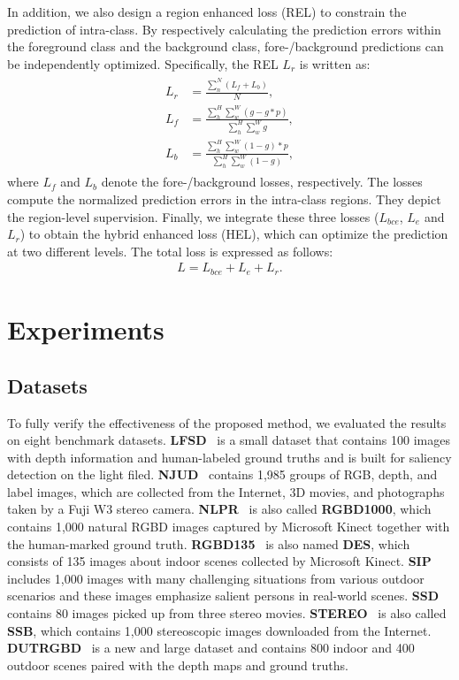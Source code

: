 \documentclass[runningheads]{llncs}
\begin{document}
In addition, we also design a region enhanced loss (REL)  to constrain the prediction of intra-class. By respectively calculating the prediction errors within the foreground class and the background class, fore-/background predictions can be independently optimized. Specifically, the REL $L_{r}$ is written as:
\begin{align}
 \begin{split}
  L_{r} & = \frac{\sum^{N}_{n} (L_{f} + L_{b})}{N}, \\
  L_{f} & = \frac{\sum^H_h\sum^W_w (g - g * p)}{\sum^H_h\sum^W_w g}, \\
  L_{b} & = \frac{\sum^H_h\sum^W_w (1 - g) * p}{\sum^H_h\sum^W_w (1 - g)},
 \end{split}
 \label{equ:regionloss}
\end{align}
\noindent where $L_{f}$ and $L_{b}$ denote the fore-/background losses, respectively. The losses compute the normalized prediction errors in the intra-class regions. They depict the region-level supervision.
Finally, we integrate these three losses ($L_{bce}$, $L_{e}$ and $L_{r}$) to obtain the hybrid enhanced loss (HEL), which can optimize the prediction at two different levels.  The total loss is expressed as follows:
\begin{equation}
 \begin{split}
  L = L_{bce} + L_{e} + L_{r}.
 \end{split}
 \label{equ:totalloss}
\end{equation}

\section{Experiments}

\subsection{Datasets}

To fully verify the effectiveness of the proposed method, we evaluated the results on eight benchmark datasets.
\textbf{LFSD}~\cite{LFSD} is a small dataset that contains 100 images with depth information and human-labeled ground truths and is built for saliency detection on the light filed.
\textbf{NJUD}~\cite{NLUD} contains 1,985 groups of RGB, depth, and label images, which are collected from the Internet, 3D movies, and photographs taken by a Fuji W3 stereo camera.
\textbf{NLPR}~\cite{NLPR} is also called \textbf{RGBD1000}, which contains 1,000 natural RGBD images captured by Microsoft Kinect together with the human-marked ground truth.
\textbf{RGBD135}~\cite{RGBD135} is also named \textbf{DES}, which consists of 135 images about indoor scenes collected by Microsoft Kinect.
\textbf{SIP}~\cite{SIP} includes 1,000 images with many challenging situations from various outdoor scenarios and these images emphasize salient persons in real-world scenes.
\textbf{SSD}~\cite{SSD} contains 80 images picked up from three
stereo movies.
\textbf{STEREO}~\cite{STEREO} is also called \textbf{SSB}, which contains 1,000 stereoscopic images downloaded from the Internet.
\textbf{DUTRGBD}~\cite{DUTRGBD} is a new and large dataset and contains 800 indoor and 400 outdoor scenes paired with the depth maps and ground truths.
\end{document}
